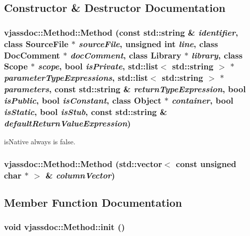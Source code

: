 \subsection{Constructor \& Destructor Documentation}
\hypertarget{classvjassdoc_1_1Method_b8d4ae00da196848f84771240386414a}{
\subsubsection{\setlength{\rightskip}{0pt plus 5cm}vjassdoc::Method::Method (const std::string \& {\em identifier}, class {\bf SourceFile} $\ast$ {\em sourceFile}, unsigned int {\em line}, class {\bf DocComment} $\ast$ {\em docComment}, class {\bf Library} $\ast$ {\em library}, class {\bf Scope} $\ast$ {\em scope}, bool {\em isPrivate}, std::list$<$ std::string $>$ $\ast$ {\em parameterTypeExpressions}, std::list$<$ std::string $>$ $\ast$ {\em parameters}, const std::string \& {\em returnTypeExpression}, bool {\em isPublic}, bool {\em isConstant}, class {\bf Object} $\ast$ {\em container}, bool {\em isStatic}, bool {\em isStub}, const std::string \& {\em defaultReturnValueExpression})}}
\label{classvjassdoc_1_1Method_b8d4ae00da196848f84771240386414a}


isNative always is false. 

\hypertarget{classvjassdoc_1_1Method_f2fa55c203e4bcf6ef1c421f9a824993}{
\subsubsection{\setlength{\rightskip}{0pt plus 5cm}vjassdoc::Method::Method (std::vector$<$ const unsigned char $\ast$ $>$ \& {\em columnVector})}}
\label{classvjassdoc_1_1Method_f2fa55c203e4bcf6ef1c421f9a824993}




\subsection{Member Function Documentation}
\hypertarget{classvjassdoc_1_1Method_cd115b1b9a459752e6613925be8e9daf}{
\subsubsection{\setlength{\rightskip}{0pt plus 5cm}void vjassdoc::Method::init ()}}
\label{classvjassdoc_1_1Method_cd115b1b9a459752e6613925be8e9daf}




